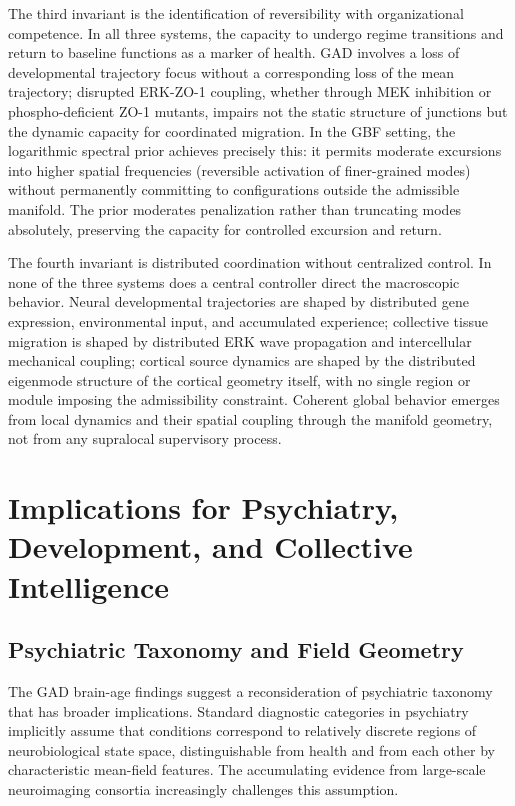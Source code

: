 \documentclass[11pt,a4paper]{article}
\theoremstyle{plain}
\theoremstyle{definition}
\begin{document}
The third invariant is the identification of reversibility with organizational competence.
In all three systems, the capacity to undergo regime transitions and return to baseline
functions as a marker of health. GAD involves a loss of developmental trajectory focus
without a corresponding loss of the mean trajectory; disrupted ERK-ZO-1 coupling,
whether through MEK inhibition or phospho-deficient ZO-1 mutants, impairs not the static
structure of junctions but the dynamic capacity for coordinated migration. In the GBF
setting, the logarithmic spectral prior achieves precisely this: it permits moderate
excursions into higher spatial frequencies (reversible activation of finer-grained modes)
without permanently committing to configurations outside the admissible manifold.
The prior moderates penalization rather than truncating modes absolutely, preserving
the capacity for controlled excursion and return.

The fourth invariant is distributed coordination without centralized control. In none
of the three systems does a central controller direct the macroscopic behavior. Neural
developmental trajectories are shaped by distributed gene expression, environmental
input, and accumulated experience; collective tissue migration is shaped by distributed
ERK wave propagation and intercellular mechanical coupling; cortical source dynamics
are shaped by the distributed eigenmode structure of the cortical geometry itself,
with no single region or module imposing the admissibility constraint. Coherent global
behavior emerges from local dynamics and their spatial coupling through the manifold
geometry, not from any supralocal supervisory process.

\section{Implications for Psychiatry, Development, and Collective Intelligence}
\label{sec:implications}

\subsection{Psychiatric Taxonomy and Field Geometry}

The GAD brain-age findings suggest a reconsideration of psychiatric taxonomy that has
broader implications. Standard diagnostic categories in psychiatry implicitly assume
that conditions correspond to relatively discrete regions of neurobiological state space,
distinguishable from health and from each other by characteristic mean-field features.
The accumulating evidence from large-scale neuroimaging consortia increasingly challenges
this assumption.
\end{document}
